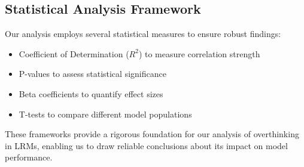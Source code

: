 \subsection{Statistical Analysis Framework}
Our analysis employs several statistical measures to ensure robust findings:
\begin{itemize}
    \item Coefficient of Determination ($R^2$) to measure correlation strength
    \item P-values to assess statistical significance
    \item Beta coefficients to quantify effect sizes
    \item T-tests to compare different model populations
\end{itemize}

These frameworks provide a rigorous foundation for our analysis of overthinking in LRMs, enabling us to draw reliable conclusions about its impact on model performance.







